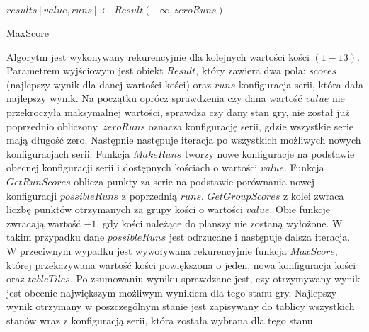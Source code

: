 \begin{pseudokod}[H]
	\vskip 1mm

	$results[value, runs] \leftarrow Result(-\infty, zeroRuns)$\;
	\caption{MaxScore}\label{alg:mine}
\end{pseudokod}
\vskip 3mm

Algorytm jest wykonywany rekurencyjnie dla kolejnych wartości kości $(1-13)$. Parametrem wyjściowym jest obiekt $Result$, który zawiera dwa pola: $scores$ (najlepszy wynik dla danej wartości kości) oraz $runs$ konfiguracja serii, która dała najlepszy wynik. Na początku oprócz sprawdzenia czy dana wartość $value$ nie przekroczyła maksymalnej wartości, sprawdza czy dany stan gry, nie został już poprzednio obliczony. $zeroRuns$ oznacza konfigurację serii, gdzie wszystkie serie mają długość zero. Następnie następuje iteracja po wszystkich możliwych nowych konfiguracjach serii. Funkcja $MakeRuns$ tworzy nowe konfiguracje na podstawie obecnej konfiguracji serii i dostępnych kościach o wartości $value$. Funkcja $GetRunScores$ oblicza punkty za serie na podstawie porównania nowej konfiguracji $possibleRuns$ z poprzednią $runs$. $GetGroupScores$ z kolei zwraca liczbę punktów otrzymanych za grupy kości o wartości $value$. Obie funkcje zwracają wartość $-1$, gdy kości należące do planszy nie zostaną wyłożone. W takim przypadku dane $possibleRuns$ jest odrzucane i następuje dalsza iteracja. W przeciwnym wypadku jest wywoływana rekurencyjnie funkcja $MaxScore$, której przekazywana wartość kości powiększona o jeden, nowa konfiguracja kości oraz $tableTiles$. Po zsumowaniu wyniku sprawdzane jest, czy otrzymywany wynik jest obecnie największym możliwym wynikiem dla tego stanu gry. Najlepszy wynik otrzymany w poszczególnym stanie jest zapisywany do tablicy wszystkich stanów wraz z konfiguracją serii, która została wybrana dla tego stanu. \\

